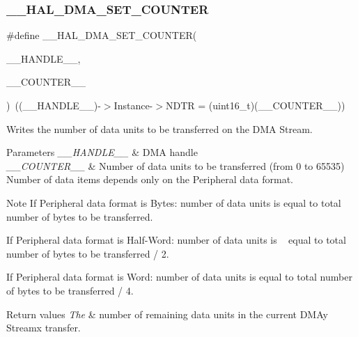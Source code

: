 \subsubsection{\texorpdfstring{\+\_\+\+\_\+\+H\+A\+L\+\_\+\+D\+M\+A\+\_\+\+S\+E\+T\+\_\+\+C\+O\+U\+N\+T\+ER}{\_\_HAL\_DMA\_SET\_COUNTER}}
{\footnotesize\ttfamily \#define \+\_\+\+\_\+\+H\+A\+L\+\_\+\+D\+M\+A\+\_\+\+S\+E\+T\+\_\+\+C\+O\+U\+N\+T\+ER(\begin{DoxyParamCaption}\item[{}]{\+\_\+\+\_\+\+H\+A\+N\+D\+L\+E\+\_\+\+\_\+,  }\item[{}]{\+\_\+\+\_\+\+C\+O\+U\+N\+T\+E\+R\+\_\+\+\_\+ }\end{DoxyParamCaption})~((\+\_\+\+\_\+\+H\+A\+N\+D\+L\+E\+\_\+\+\_\+)-\/$>$Instance-\/$>$N\+D\+TR = (uint16\+\_\+t)(\+\_\+\+\_\+\+C\+O\+U\+N\+T\+E\+R\+\_\+\+\_\+))}



Writes the number of data units to be transferred on the D\+MA Stream. 


\begin{DoxyParams}{Parameters}
{\em \+\_\+\+\_\+\+H\+A\+N\+D\+L\+E\+\_\+\+\_\+} & D\+MA handle \\
\hline
{\em \+\_\+\+\_\+\+C\+O\+U\+N\+T\+E\+R\+\_\+\+\_\+} & Number of data units to be transferred (from 0 to 65535) Number of data items depends only on the Peripheral data format.\\
\hline
\end{DoxyParams}
\begin{DoxyNote}{Note}
If Peripheral data format is Bytes\+: number of data units is equal to total number of bytes to be transferred.

If Peripheral data format is Half-\/\+Word\+: number of data units is ~\newline
 equal to total number of bytes to be transferred / 2.

If Peripheral data format is Word\+: number of data units is equal to total number of bytes to be transferred / 4.
\end{DoxyNote}

\begin{DoxyRetVals}{Return values}
{\em The} & number of remaining data units in the current D\+M\+Ay Streamx transfer. \\
\hline
\end{DoxyRetVals}
